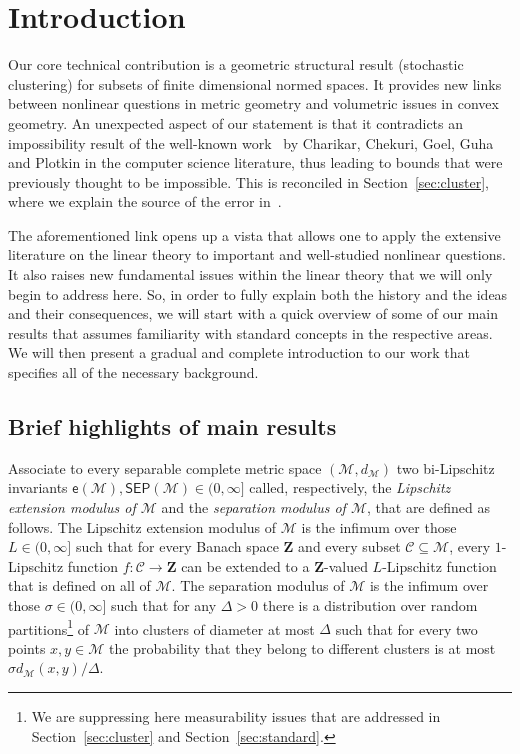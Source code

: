 \documentclass[11pt,reqno]{amsart}
\theoremstyle{remark}
\newcommand{\MM}{\mathcal{M}}
\renewcommand{\subset}{\subseteq}
\newcommand{\ee}{\mathsf{e}}
\newcommand{\bfZ}{\mathbf{Z}}
\newcommand{\sub}{\mathscr{C}}
\renewcommand{\1}{\mathbf 1}
\newcommand{\sep}{\mathsf{SEP}}
\begin{document}
\setcounter{tocdepth}{4}

\newpage

\tableofcontents

\section{Introduction}

Our core technical contribution is a geometric structural result (stochastic clustering) for subsets of finite dimensional normed spaces. It provides new links between nonlinear questions in metric geometry and volumetric issues in convex geometry. An unexpected aspect of our statement is that it contradicts an impossibility result of the well-known work~\cite{CCGGP98} by Charikar, Chekuri, Goel, Guha and Plotkin in the computer science literature, thus leading to  bounds that were previously thought to be impossible. This is reconciled in Section~\ref{sec:cluster}, where we explain the source of the error in~\cite{CCGGP98}.

The aforementioned link opens up a vista that allows one to apply the extensive literature on the linear theory to important and well-studied nonlinear questions. It also raises new fundamental issues within the linear theory that we will only begin to address here. So, in order to fully explain both the history and the ideas and their consequences, we will start with a quick overview of some of our main results that assumes familiarity with standard concepts in the respective areas. We  will then present a gradual and complete introduction to our work that specifies all of the necessary background.


\subsection{Brief highlights of main results}\label{sec:brief} Associate to every separable complete metric space $(\MM,d_\MM)$ two bi-Lipschitz invariants $\ee(\MM), \sep(\MM)\in (0,\infty]$ called, respectively,  the {\em Lipschitz extension modulus of $\MM$} and the {\em separation modulus of $\MM$}, that are defined as follows. The Lipschitz extension modulus of $\MM$ is the infimum over those $L\in (0,\infty]$ such that for {every} Banach space $\bfZ$ and {every} subset $\sub\subset \MM$, {every} $1$-Lipschitz function $f:\sub\to \bfZ$ can be extended to a $\bfZ$-valued $L$-Lipschitz function that is defined on all of $\MM$. The separation modulus of $\MM$ is the infimum over those $\sigma\in (0,\infty]$ such that for any $\Delta>0$ there is a distribution over random partitions\footnote{We are suppressing here measurability issues that are addressed  in Section~\ref{sec:cluster} and Section~\ref{sec:standard}.} of $\MM$ into clusters of diameter at most $\Delta$ such that for every two points $x,y\in \MM$ the probability that they belong to different clusters is at most $\sigma d_\MM(x,y)/\Delta$.
\end{document}
